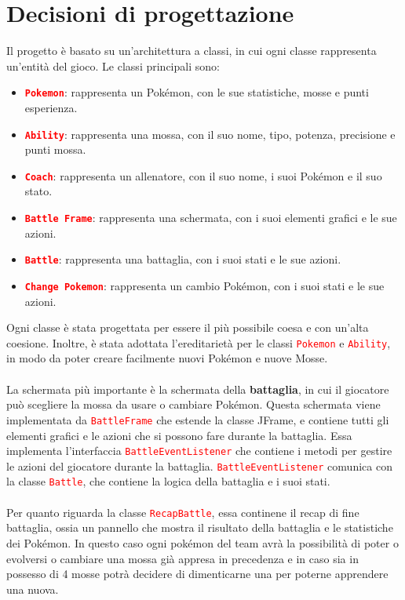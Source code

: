 \documentclass[12pt]{article}
\begin{document}
\newpage
\section{Decisioni di progettazione}
Il progetto è basato su un'architettura a classi, in cui ogni classe rappresenta un'entità del gioco. Le classi principali sono:
\begin{itemize}
    \item \textbf{\texttt{\textcolor{red}{Pokemon}}}: rappresenta un Pokémon, con le sue statistiche, mosse e punti esperienza.
    \item \textbf{\texttt{\textcolor{red}{Ability}}}: rappresenta una mossa, con il suo nome, tipo, potenza, precisione e punti mossa.
    \item \textbf{\texttt{\textcolor{red}{Coach}}}: rappresenta un allenatore, con il suo nome, i suoi Pokémon e il suo stato.
    \item \textbf{\texttt{\textcolor{red}{Battle Frame}}}: rappresenta una schermata, con i suoi elementi grafici e le sue azioni.
    \item \textbf{\texttt{\textcolor{red}{Battle}}}: rappresenta una battaglia, con i suoi stati e le sue azioni.
    \item \textbf{\texttt{\textcolor{red}{Change Pokemon}}}: rappresenta un cambio Pokémon, con i suoi stati e le sue azioni.
\end{itemize}
Ogni classe è stata progettata per essere il più possibile coesa e con un'alta coesione. Inoltre, è stata adottata l'ereditarietà per le classi \texttt{\textcolor{red}{Pokemon}} e \texttt{\textcolor{red}{Ability}}, in modo da poter creare facilmente nuovi Pokémon e nuove Mosse. 
\\ \\
La schermata più importante è la schermata della \textbf{battaglia}, in cui il giocatore può scegliere la mossa da usare o cambiare Pokémon. Questa schermata viene implementata da \texttt{\textcolor{red}{BattleFrame}} che estende la classe JFrame, e contiene tutti gli elementi grafici e le azioni che si possono fare durante la battaglia.
Essa implementa l'interfaccia \texttt{\textcolor{red}{BattleEventListener}} che contiene i metodi per gestire le azioni del giocatore durante la battaglia. \texttt{\textcolor{red}{BattleEventListener}} comunica con la classe \texttt{\textcolor{red}{Battle}}, che contiene la logica della battaglia e i suoi stati.
\\ \\
Per quanto riguarda la classe \texttt{\textcolor{red}{RecapBattle}}, essa continene il recap di fine battaglia, ossia un pannello che mostra il risultato della battaglia e le statistiche dei Pokémon.
In questo caso ogni pokémon del team avrà la possibilità di poter o evolversi o cambiare una mossa già appresa in precedenza e in caso sia in possesso di 4 mosse potrà decidere di dimenticarne una per poterne apprendere una nuova.
\\ \\
\end{document}
